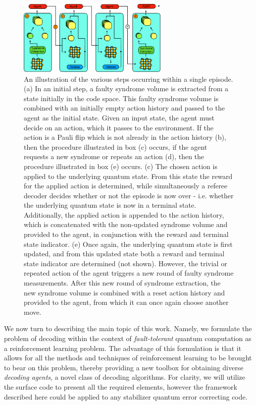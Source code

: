 \documentclass[twocolumn,preprintnumbers,amsmath,amssymb,notitlepage,nofootinbib,longbibliography,superscriptaddress,aps,pra,10pt]{revtex4-1}
\begin{document}
	\begin{figure}
		\centering
		\includegraphics[width=0.65\textwidth]{figures/decoding_as_rl.pdf}
		\caption{
			An illustration of the various steps occurring within a single episode.
			(a) In an initial step, a faulty syndrome volume is extracted from a state initially in the code space.
			This faulty syndrome volume is combined with an initially empty action history and passed to the agent as the initial state.
			Given an input state, the agent must decide on an action, which it passes to the environment.
			If the action is a Pauli flip which is not already in the action history (b), then the procedure illustrated in box (c) occurs, if the agent requests a new syndrome or repeats an action (d), then the procedure illustrated in box (e) occurs.
			(c) The chosen action is applied to the underlying quantum state.
			From this state the reward for the applied action is determined, while simultaneously a referee decoder decides whether or not the episode is now over - i.e.
			whether the underlying quantum state is now in a terminal state.
			Additionally, the applied action is appended to the action history, which is concatenated with the non-updated syndrome volume and provided to the agent, in conjunction with the reward and terminal state indicator.
			(e) Once again, the underlying quantum state is first updated, and from this updated state both a reward and terminal state indicator are determined (not shown).
			However, the trivial or repeated action of the agent triggers a new round of faulty syndrome measurements.
			After this new round of syndrome extraction, the new syndrome volume is combined with a reset action history and provided to the agent, from which it can once again choose another move.
		}
		\label{f:single_episode}
	\end{figure}

	We now turn to describing the main topic of this work. 
	Namely, we formulate the problem of decoding within the context of \emph{fault-tolerant} quantum computation as a reinforcement learning problem.
	The advantage of this formulation is that it allows for all the methods and techniques of reinforcement learning to be brought to bear on this problem, thereby providing a new toolbox for obtaining diverse \emph{decoding agents}, a novel class of decoding algorithms.
	For clarity, we will utilize the surface code to present all the required elements, however the framework described here could be applied to any stabilizer quantum error correcting code.
\end{document}
